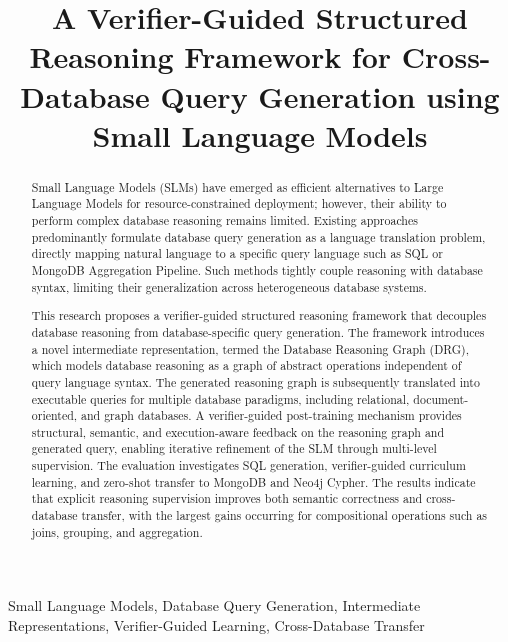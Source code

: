\documentclass[conference]{IEEEtran}
\begin{document}
\title{A Verifier-Guided Structured Reasoning Framework for Cross-Database Query Generation using Small Language Models}

\author{
}

\maketitle

\begin{abstract}
Small Language Models (SLMs) have emerged as efficient alternatives to Large Language Models for resource-constrained deployment; however, their ability to perform complex database reasoning remains limited. Existing approaches predominantly formulate database query generation as a language translation problem, directly mapping natural language to a specific query language such as SQL or MongoDB Aggregation Pipeline. Such methods tightly couple reasoning with database syntax, limiting their generalization across heterogeneous database systems.

This research proposes a verifier-guided structured reasoning framework that decouples database reasoning from database-specific query generation. The framework introduces a novel intermediate representation, termed the Database Reasoning Graph (DRG), which models database reasoning as a graph of abstract operations independent of query language syntax. The generated reasoning graph is subsequently translated into executable queries for multiple database paradigms, including relational, document-oriented, and graph databases. A verifier-guided post-training mechanism provides structural, semantic, and execution-aware feedback on the reasoning graph and generated query, enabling iterative refinement of the SLM through multi-level supervision. The evaluation investigates SQL generation, verifier-guided curriculum learning, and zero-shot transfer to MongoDB and Neo4j Cypher. The results indicate that explicit reasoning supervision improves both semantic correctness and cross-database transfer, with the largest gains occurring for compositional operations such as joins, grouping, and aggregation.
\end{abstract}

\begin{IEEEkeywords}
Small Language Models, Database Query Generation, Intermediate Representations, Verifier-Guided Learning, Cross-Database Transfer
\end{IEEEkeywords}
\end{document}
